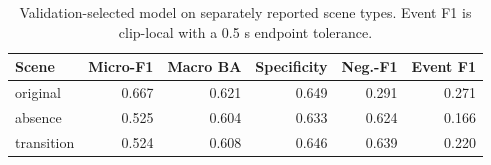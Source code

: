 \begin{table}[H]\centering\small
\caption{Validation-selected model on separately reported scene types. Event F1 is clip-local with a 0.5 s endpoint tolerance.}\label{tab:variants}
\begin{tabular}{lrrrrr}\toprule
Scene & Micro-F1 & Macro BA & Specificity & Neg.-F1 & Event F1 \\\midrule
original & 0.667 & 0.621 & 0.649 & 0.291 & 0.271 \\
absence & 0.525 & 0.604 & 0.633 & 0.624 & 0.166 \\
transition & 0.524 & 0.608 & 0.646 & 0.639 & 0.220 \\
\bottomrule\end{tabular}\end{table}